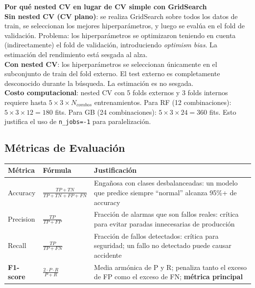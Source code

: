 \documentclass[12pt,a4paper]{article}
\begin{document}
\begin{porquebox}
\textbf{Por qu\'{e} nested CV en lugar de CV simple con GridSearch}\\[4pt]
\textbf{Sin nested CV (CV plano)}: se realiza GridSearch sobre todos los datos de
train, se seleccionan los mejores hiperpar\'{a}metros, y luego se eval\'{u}a en el
fold de validaci\'{o}n. Problema: los hiperpar\'{a}metros se optimizaron teniendo en
cuenta (indirectamente) el fold de validaci\'{o}n, introduciendo \textit{optimism bias}.
La estimaci\'{o}n del rendimiento est\'{a} sesgada al alza.\\[4pt]
\textbf{Con nested CV}: los hiperpar\'{a}metros se seleccionan \'{u}nicamente en el
subconjunto de train del fold externo. El test externo es completamente desconocido
durante la b\'{u}squeda. La estimaci\'{o}n es no sesgada.\\[4pt]
\textbf{Costo computacional}: nested CV con 5 folds externos y 3 folds internos
requiere hasta $5 \times 3 \times N_{combos}$ entrenamientos. Para RF (12
combinaciones): $5 \times 3 \times 12 = 180$ fits. Para GB (24 combinaciones):
$5 \times 3 \times 24 = 360$ fits. Esto justifica el uso de \texttt{n\_jobs=-1}
para paralelizaci\'{o}n.
\end{porquebox}

\subsection{M\'{e}tricas de Evaluaci\'{o}n}

\begin{center}
\begin{tabular}{lp{5.5cm}p{4.5cm}}
\toprule
\textbf{M\'{e}trica} & \textbf{F\'{o}rmula} & \textbf{Justificaci\'{o}n} \\
\midrule
Accuracy & $\frac{TP+TN}{TP+TN+FP+FN}$ & Engañosa con clases desbalanceadas: un modelo que predice siempre ``normal'' alcanza 95\%+ de accuracy \\
\addlinespace
Precision & $\frac{TP}{TP+FP}$ & Fracción de alarmas que son fallos reales: crítica para evitar paradas innecesarias de producción \\
\addlinespace
Recall & $\frac{TP}{TP+FN}$ & Fracción de fallos detectados: crítica para seguridad; un fallo no detectado puede causar accidente \\
\addlinespace
\textbf{F1-score} & $\frac{2 \cdot P \cdot R}{P+R}$ & Media arm\'{o}nica de P y R; penaliza tanto el exceso de FP como el exceso de FN; \textbf{m\'{e}trica principal} \\
\bottomrule
\end{tabular}
\end{center}
\end{document}
